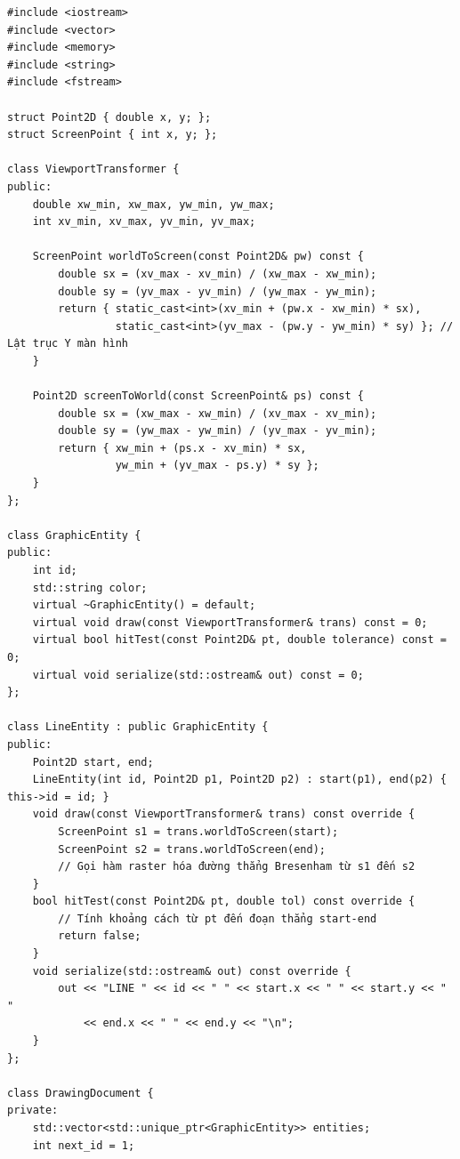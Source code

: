 \begin{verbatim}
#include <iostream>
#include <vector>
#include <memory>
#include <string>
#include <fstream>

struct Point2D { double x, y; };
struct ScreenPoint { int x, y; };

class ViewportTransformer {
public:
    double xw_min, xw_max, yw_min, yw_max;
    int xv_min, xv_max, yv_min, yv_max;

    ScreenPoint worldToScreen(const Point2D& pw) const {
        double sx = (xv_max - xv_min) / (xw_max - xw_min);
        double sy = (yv_max - yv_min) / (yw_max - yw_min);
        return { static_cast<int>(xv_min + (pw.x - xw_min) * sx),
                 static_cast<int>(yv_max - (pw.y - yw_min) * sy) }; // Lật trục Y màn hình
    }

    Point2D screenToWorld(const ScreenPoint& ps) const {
        double sx = (xw_max - xw_min) / (xv_max - xv_min);
        double sy = (yw_max - yw_min) / (yv_max - yv_min);
        return { xw_min + (ps.x - xv_min) * sx,
                 yw_min + (yv_max - ps.y) * sy };
    }
};

class GraphicEntity {
public:
    int id;
    std::string color;
    virtual ~GraphicEntity() = default;
    virtual void draw(const ViewportTransformer& trans) const = 0;
    virtual bool hitTest(const Point2D& pt, double tolerance) const = 0;
    virtual void serialize(std::ostream& out) const = 0;
};

class LineEntity : public GraphicEntity {
public:
    Point2D start, end;
    LineEntity(int id, Point2D p1, Point2D p2) : start(p1), end(p2) { this->id = id; }
    void draw(const ViewportTransformer& trans) const override {
        ScreenPoint s1 = trans.worldToScreen(start);
        ScreenPoint s2 = trans.worldToScreen(end);
        // Gọi hàm raster hóa đường thẳng Bresenham từ s1 đến s2
    }
    bool hitTest(const Point2D& pt, double tol) const override {
        // Tính khoảng cách từ pt đến đoạn thẳng start-end
        return false;
    }
    void serialize(std::ostream& out) const override {
        out << "LINE " << id << " " << start.x << " " << start.y << " " 
            << end.x << " " << end.y << "\n";
    }
};

class DrawingDocument {
private:
    std::vector<std::unique_ptr<GraphicEntity>> entities;
    int next_id = 1;


\end{verbatim}
